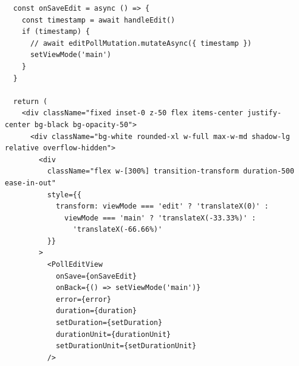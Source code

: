 \documentclass[14pt]{extreport}
\begin{document}
\begin{multicols}{2}
{\begin{lstlisting}
  const onSaveEdit = async () => {
    const timestamp = await handleEdit()
    if (timestamp) {
      // await editPollMutation.mutateAsync({ timestamp })
      setViewMode('main')
    }
  }

  return (
    <div className="fixed inset-0 z-50 flex items-center justify-center bg-black bg-opacity-50">
      <div className="bg-white rounded-xl w-full max-w-md shadow-lg relative overflow-hidden">
        <div
          className="flex w-[300%] transition-transform duration-500 ease-in-out"
          style={{
            transform: viewMode === 'edit' ? 'translateX(0)' :
              viewMode === 'main' ? 'translateX(-33.33%)' :
                'translateX(-66.66%)'
          }}
        >
          <PollEditView
            onSave={onSaveEdit}
            onBack={() => setViewMode('main')}
            error={error}
            duration={duration}
            setDuration={setDuration}
            durationUnit={durationUnit}
            setDurationUnit={setDurationUnit}
          />


\end{lstlisting}}
\end{multicols}
\end{document}
